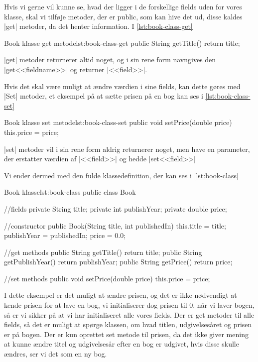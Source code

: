 Hvis vi gerne vil kunne se, hvad der ligger i de forskellige fields uden for vores klasse, skal vi tilføje metoder, der er public, som kan hive det ud, disse kaldes \JavaInline|get| metoder, da det henter information. I \autoref{lst:book-class-get}

\begin{JavaCode}{Book klasse get metode}{lst:book-class-get}
	public String getTitle() {
		return title;
	}
\end{JavaCode}

\JavaInline|get| metoder returnerer altid noget, og i sin rene form navngives den \JavaInline|get<<fieldname>>| og returner \JavaInline|<<field>>|.

Hvis det skal være muligt at ændre værdien i sine fields, kan dette gøres med \JavaInline|Set| metoder, et eksempel på at sætte prisen på en bog kan ses i \autoref{lst:book-class-set}

\begin{JavaCode}{Book klasse set metode}{lst:book-class-set}
	public void setPrice(double price) {
		this.price = price;
	}
\end{JavaCode}

\JavaInline|set| metoder vil i sin rene form aldrig returnerer noget, men have en parameter, der erstatter værdien af \JavaInline|<<field>>| og hedde \JavaInline|set<<field>>|

Vi ender dermed med den fulde klassedefinition, der kan ses i \autoref{lst:book-class}

\begin{JavaCode}{Book klasse}{lst:book-class}
	public class Book {
		//fields
		private String title;
		private int publishYear;
		private double price;
		
		//constructor
		public Book(String title, int publishedIn) {
			this.title = title;
			publishYear = publishedIn;
			price = 0.0;
		}
	
		//get methods
		public String getTitle() {
			return title;
		}
		public String getPublishYear() {
			return publishYear;
		}
		public String getPrice() {
			return price;
		}
		
		//set methods
		public void setPrice(double price) {
			this.price = price;
		}
	}
\end{JavaCode}

I dette eksempel er det muligt at ændre prisen, og det er ikke nødvendigt at kende prisen for at lave en bog, vi initialiserer dog prisen til 0, når vi laver bogen, så er vi sikker på at vi har initialiseret alle vores fields. Der er get metoder til alle fields, så det er muligt at spørge klassen, om hvad titlen, udgivelsesåret og prisen er på bogen. Der er kun oprettet set metode til prisen, da det ikke giver mening at kunne ændre titel og udgivelsesår efter en bog er udgivet, hvis disse skulle ændres, ser vi det som en ny bog.

